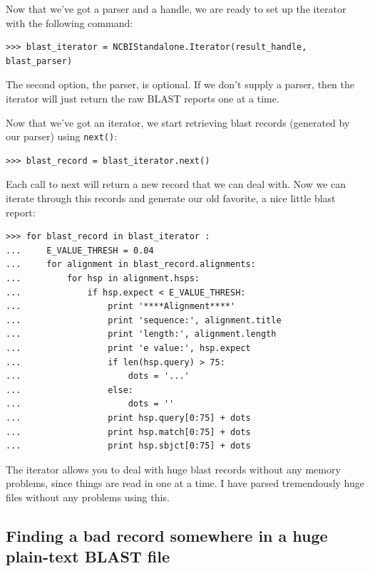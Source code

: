 \documentclass{report}
\begin{document}
Now that we've got a parser and a handle, we are ready to set up the iterator with the following command:

\begin{verbatim}
>>> blast_iterator = NCBIStandalone.Iterator(result_handle, blast_parser)
\end{verbatim}

The second option, the parser, is optional. If we don't supply a parser, then the iterator will just return the raw BLAST reports one at a time.

Now that we've got an iterator, we start retrieving blast records (generated by our parser) using \verb|next()|:

\begin{verbatim}
>>> blast_record = blast_iterator.next()
\end{verbatim}

Each call to next will return a new record that we can deal with. Now we can iterate through this records and generate our old favorite, a nice little blast report:

\begin{verbatim}
>>> for blast_record in blast_iterator :
...     E_VALUE_THRESH = 0.04
...     for alignment in blast_record.alignments:
...         for hsp in alignment.hsps:
...             if hsp.expect < E_VALUE_THRESH:
...                 print '****Alignment****'
...                 print 'sequence:', alignment.title
...                 print 'length:', alignment.length
...                 print 'e value:', hsp.expect
...                 if len(hsp.query) > 75:
...                     dots = '...'
...                 else:
...                     dots = ''
...                 print hsp.query[0:75] + dots
...                 print hsp.match[0:75] + dots
...                 print hsp.sbjct[0:75] + dots
\end{verbatim}


The iterator allows you to deal with huge blast records without any memory problems, since things are read in one at a time. I have parsed tremendously huge files without any problems using this.

\subsection{Finding a bad record somewhere in a huge plain-text BLAST file}
\end{document}
